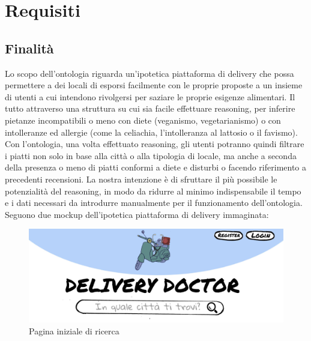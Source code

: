 \documentclass[12pt]{article}
\begin{document}
\section{Requisiti}

\subsection{Finalità}
Lo scopo dell'ontologia riguarda un'ipotetica piattaforma di delivery che possa permettere a dei locali di esporsi facilmente con le proprie proposte a un insieme di utenti a cui intendono rivolgersi per saziare le proprie esigenze alimentari. 
Il tutto attraverso una struttura su cui sia facile effettuare reasoning, per  inferire pietanze incompatibili o meno con diete (veganismo, vegetarianismo) o con intolleranze ed allergie (come la celiachia, l'intolleranza al lattosio o il favismo).\newline 
Con l'ontologia, una volta effettuato reasoning, gli utenti potranno quindi filtrare i piatti non solo in base alla città o alla tipologia di locale, ma anche a seconda della presenza o meno di piatti conformi a diete e disturbi o facendo riferimento a precedenti recensioni.\newline
La nostra intenzione è di sfruttare il più possibile le potenzialità del reasoning, in modo da ridurre al minimo indispensabile il tempo e i dati necessari da introdurre manualmente per il funzionamento dell'ontologia.\newline
Seguono due mockup dell'ipotetica piattaforma di delivery immaginata:
\label{sec:mockupFinali}
\begin{figure}[H]
    \centering
         \includegraphics[width=12cm]{files/mockup1.jpg}
    \caption{Pagina iniziale di ricerca}
\end{figure}
\end{document}
